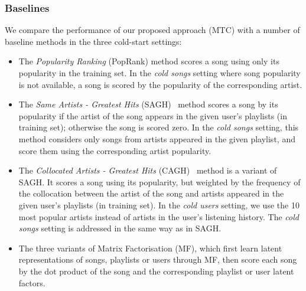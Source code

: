 \subsubsection{Baselines}
We compare the performance of our proposed approach (\ie MTC) %
with a number of baseline methods in the three cold-start settings:
\begin{itemize}
\item The {\it Popularity Ranking} (PopRank) method scores a song using only its popularity in the training set.
      In the \emph{cold songs} setting where song popularity is not available, 
      a song is scored by the popularity of the corresponding artist.
\item The {\it Same Artists - Greatest Hits} (SAGH)~\cite{mcfee2012million} method scores a song
      by its popularity if the artist of the song appears in the given user's playlists (in training set);
      otherwise the song is scored zero.
      In the {\it cold songs} setting, this method considers only songs from artists appeared in the given playlist,
      and score them using the corresponding artist popularity.
\item The {\it Collocated Artists - Greatest Hits} (CAGH)~\cite{bonnin2013evaluating} method is a variant of SAGH.
      It scores a song using its popularity, but weighted by the frequency of the collocation between the artist of the song
      and artists appeared in the given user's playlists (in training set).
      In the \emph{cold users} setting, we use the 10 most popular artists instead of artists in the user's listening history.
      The \emph{cold songs} setting is addressed in the same way as in SAGH.
\item The three variants of Matrix Factorisation (MF), which first learn latent representations of songs, playlists or users
      through MF, then score each song by the dot product of the song and the corresponding playlist or user latent factors.

\end{itemize}
